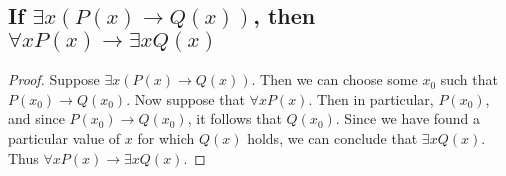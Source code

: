 \documentclass{report}
\theoremstyle{definition}
\begin{document}
\subsection{If $\exists x(P(x)\to Q(x))$, then $\forall xP(x)\to\exists xQ(x)$}
\begin{proof}
Suppose $\exists x(P(x)\to Q(x))$. Then we can choose some $x_0$ such that $P(x_0)\to Q(x_0)$. Now suppose that $\forall xP(x)$.
Then in particular, $P(x_0)$, and since $P(x_0)\to Q(x_0)$, it follows that $Q(x_0)$. Since we have found a particular 
value of $x$ for which $Q(x)$ holds, we can conclude that $\exists xQ(x)$. Thus $\forall xP(x)\to\exists xQ(x)$.
\end{proof}
\newpage

\subsection{}
\end{document}
